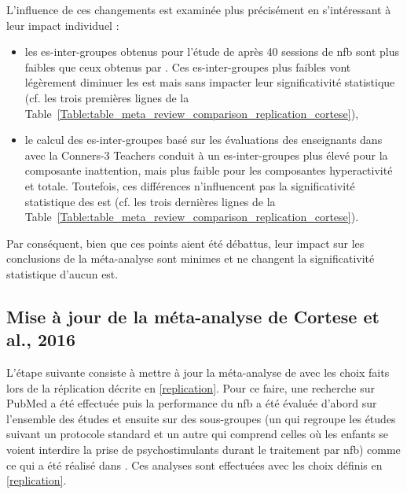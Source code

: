 L'influence de ces changements est examinée plus précisément en s'intéressant à leur impact individuel :
\begin{itemize}
\item les \gls{es}-inter-groupes obtenus pour l'étude de \citet{Arnold2014} après 40 sessions de \gls{nfb} sont plus faibles que ceux obtenus 
par \citet{Cortese2016}. Ces \gls{es}-inter-groupes plus faibles vont légèrement diminuer les \gls{est} mais sans impacter leur significativité statistique 
(cf. les trois premières lignes de la Table~\ref{Table:table_meta_review_comparison_replication_cortese}),
\item le calcul des \gls{es}-inter-groupes basé sur les évaluations des enseignants dans \citet{Steiner2014} avec la Conners-3 Teachers
conduit à un \gls{es}-inter-groupes plus élevé pour la composante inattention, mais plus faible pour les composantes hyperactivité et totale. Toutefois, ces
différences n'influencent pas la significativité statistique des \gls{est} (cf. les trois dernières lignes de la 
Table~\ref{Table:table_meta_review_comparison_replication_cortese}). 
\end{itemize}

Par conséquent, bien que ces points aient été débattus, leur impact sur les conclusions de la méta-analyse sont minimes et ne changent la significativité statistique 
d'aucun \gls{est}. 

\subsection{Mise à jour de la méta-analyse de Cortese et al., 2016} \label{selection_studies}

L'étape suivante consiste à mettre à jour la méta-analyse de \citet{Cortese2016} avec les choix faits lors de la réplication décrite en \ref{replication}. 
Pour ce faire, une recherche sur PubMed a été effectuée puis la performance du \gls{nfb} a été évaluée d'abord sur l'ensemble des études et ensuite sur 
des sous-groupes (un qui regroupe les études suivant un protocole standard \citep{Arns2014} et un autre qui comprend celles où les enfants se voient interdire la prise
de psychostimulants durant le traitement par \gls{nfb}) comme ce qui a été réalisé dans \citet{Cortese2016}. Ces analyses sont effectuées avec les choix définis en \ref{replication}.

